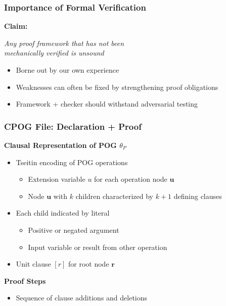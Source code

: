 \documentclass[t,pdf]{beamer}
\newcommand{\bitem}{\item[$\bullet$]}
\newcommand{\makenode}[1]{{\mathbf #1}}
\newcommand{\nodeu}{\makenode{u}}
\newcommand{\noder}{\makenode{r}}
\begin{document}
\begin{frame}
\frametitle{Importance of Formal Verification}

\bigskip
    {\bf Claim:}
    
\medskip
\begin{center}
{\em\Large Any proof framework that has not been \\[0.3em] mechanically verified is unsound}
\end{center}
\medskip

         \begin{itemize}
           \item Borne out by our own experience
           \item Weaknesses can often be fixed by strengthening proof obligations
           \item Framework + checker should withstand adversarial testing
         \end{itemize}

\end{frame}


\begin{frame}
\frametitle{CPOG File: Declaration + Proof}
           \bigskip
           
           {\bf Clausal Representation of POG $\theta_P$}
           \medskip
           \begin{itemize}
             \item Tseitin encoding of POG operations
               \begin{itemize}
             \bitem Extension variable $u$ for each operation node  $\nodeu$
             \bitem Node $\nodeu$ with $k$ children characterized  by $k+1$ defining clauses
             \end{itemize}
             \item Each child indicated by literal
               \begin{itemize}
                 \bitem Positive or negated argument
                 \bitem Input variable or result from other operation
               \end{itemize}
             \item Unit clause $[r]$ for root node $\noder$
           \end{itemize}

           \bigskip
               {\bf Proof Steps}
               \medskip
               \begin{itemize}
                 \item Sequence of clause additions and deletions
               \end{itemize}


\end{frame}
\end{document}
